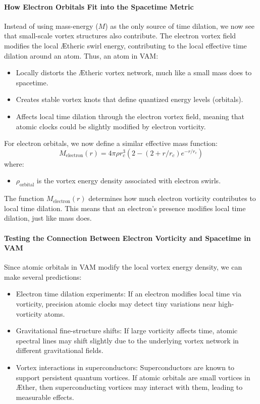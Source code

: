 \paragraph{How Electron Orbitals Fit into the Spacetime Metric}
Instead of using mass-energy ($M$) as the only source of time dilation, we now see that small-scale vortex structures also contribute.
The electron vortex field modifies the local \AE theric swirl energy, contributing to the local effective time dilation around an atom.
Thus, an atom in VAM:
\begin{itemize}
    \item Locally distorts the \AE theric vortex network, much like a small mass does to spacetime.
    \item Creates stable vortex knots that define quantized energy levels (orbitals).
    \item Affects local time dilation through the electron vortex field, meaning that atomic clocks could be slightly modified by electron vorticity.
\end{itemize}
For electron orbitals, we now define a similar effective mass function:
\begin{equation}
    M_{\text{electron}}(r)=4 \pi \rho r_c^3  \left( 2 - (2 + r/r_c) e^{-r / r_c} \right)
\end{equation}
where:
\begin{itemize}
    \item $\rho_{\text{orbital}}$ is the vortex energy density associated with electron swirls.
\end{itemize}
The function $M_{\text{electron}}(r)$ determines how much electron vorticity contributes to local time dilation.
This means that an electron’s presence modifies local time dilation, just like mass does.

\paragraph{Testing the Connection Between Electron Vorticity and Spacetime in VAM}
Since atomic orbitals in VAM modify the local vortex energy density, we can make several predictions:
\begin{itemize}
    \item Electron time dilation experiments: If an electron modifies local time via vorticity, precision atomic clocks may detect tiny variations near high-vorticity atoms.
    \item Gravitational fine-structure shifts: If large vorticity affects time, atomic spectral lines may shift slightly due to the underlying vortex network in different gravitational fields.
    \item Vortex interactions in superconductors: Superconductors are known to support persistent quantum vortices. If atomic orbitals are small vortices in \AE ther, then superconducting vortices may interact with them, leading to measurable effects.
\end{itemize}

